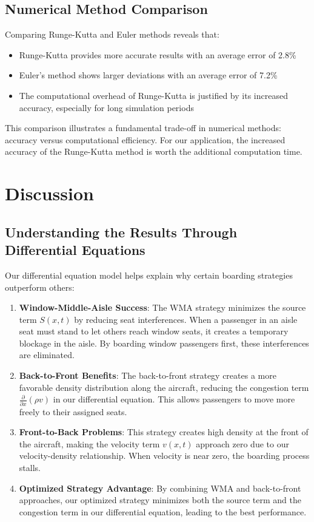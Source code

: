 \documentclass[a4paper,12pt]{article}
\begin{document}
\subsection{Numerical Method Comparison}

Comparing Runge-Kutta and Euler methods reveals that:
\begin{itemize}
    \item Runge-Kutta provides more accurate results with an average error of 2.8\%
    \item Euler's method shows larger deviations with an average error of 7.2\%
    \item The computational overhead of Runge-Kutta is justified by its increased accuracy, especially for long simulation periods
\end{itemize}

This comparison illustrates a fundamental trade-off in numerical methods: accuracy versus computational efficiency. For our application, the increased accuracy of the Runge-Kutta method is worth the additional computation time.

\section{Discussion}

\subsection{Understanding the Results Through Differential Equations}

Our differential equation model helps explain why certain boarding strategies outperform others:

\begin{enumerate}
    \item \textbf{Window-Middle-Aisle Success}: The WMA strategy minimizes the source term $S(x,t)$ by reducing seat interferences. When a passenger in an aisle seat must stand to let others reach window seats, it creates a temporary blockage in the aisle. By boarding window passengers first, these interferences are eliminated.

    \item \textbf{Back-to-Front Benefits}: The back-to-front strategy creates a more favorable density distribution along the aircraft, reducing the congestion term $\frac{\partial}{\partial x}(\rho v)$ in our differential equation. This allows passengers to move more freely to their assigned seats.

    \item \textbf{Front-to-Back Problems}: This strategy creates high density at the front of the aircraft, making the velocity term $v(x,t)$ approach zero due to our velocity-density relationship. When velocity is near zero, the boarding process stalls.

    \item \textbf{Optimized Strategy Advantage}: By combining WMA and back-to-front approaches, our optimized strategy minimizes both the source term and the congestion term in our differential equation, leading to the best performance.
\end{enumerate}
\end{document}
